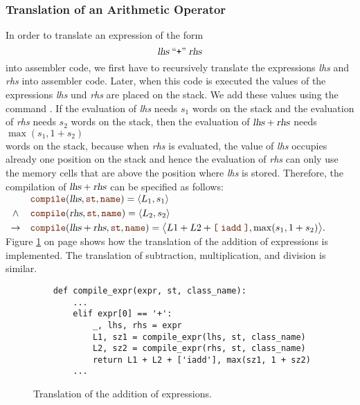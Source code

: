 \subsubsection{Translation of an Arithmetic Operator}
In order to translate an expression of the form
\[ \textsl{lhs} \;\mbox{``\texttt{+}''}\; \textsl{rhs} \]
into assembler code, we first have to recursively translate the expressions \textsl{lhs} and
\textsl{rhs} into assembler code.  Later, when this code is executed the values of the expressions
\textsl{lhs} und \textsl{rhs} are placed on the stack.  We add these values using the command .
If the evaluation of \textsl{lhs} needs $s_1$ words on the stack and the evaluation of \textsl{rhs} needs $s_2$
words on the stack, then the evaluation of $\textsl{lhs} + \textsl{rhs}$ needs 
\\[0.2cm]
\hspace*{1.3cm}
$\max(s_1, 1 + s_2)$
\\[0.2cm]
words on the stack, because when \textsl{rhs} is evaluated, the value of \textsl{lhs} occupies already one position
on the stack and hence the evaluation of \textsl{rhs} can only use the memory cells that are above the position
where \textsl{lhs} is stored. Therefore, the compilation of $\textsl{lhs} + \textsl{rhs}$ can be specified as
follows:
\\[0.2cm]
\hspace*{1.3cm}
$
\begin{array}[t]{cll}
        & \mytt{compile}(\textsl{lhs}, \mytt{st}, \mytt{name}) = \pair(L_1, s_1)  \\[0.1cm]
\wedge  & \mytt{compile}(\textsl{rhs}, \mytt{st}, \mytt{name}) = \pair(L_2, s_2)  \\[0.1cm]
\rightarrow & \mytt{compile}(\textsl{lhs} + \textsl{rhs}, \mytt{st}, \mytt{name}) = 
            \bigl\langle L1 + L2 + \mytt{[}\; \mytt{iadd} \;\mytt{]}, \max(s_1, 1+s_2) \bigr\rangle.
\end{array}$
\\[0.2cm]
Figure \ref{fig:Compiler.ipynb:compile:iadd} on page \pageref{fig:Compiler.ipynb:compile:iadd} shows how the
translation of the addition of expressions is implemented.  The translation of subtraction, multiplication, and
division is similar.

\begin{figure}[!ht]
\centering
\begin{verbatim}
    def compile_expr(expr, st, class_name):
        ...
        elif expr[0] == '+':
            _, lhs, rhs = expr
            L1, sz1 = compile_expr(lhs, st, class_name)
            L2, sz2 = compile_expr(rhs, st, class_name)
            return L1 + L2 + ['iadd'], max(sz1, 1 + sz2) 
        ...
\end{verbatim}
\vspace*{-0.3cm}
\caption{Translation of the addition of expressions.}
\label{fig:Compiler.ipynb:compile:iadd}
\end{figure}


